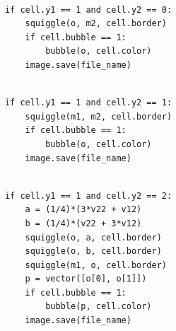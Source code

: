\documentclass{book}
\newcounter{pcounter}
\begin{document}
\begin{center}
\begin{tcolorbox}[width=5in,colback={white},title={\begin{center}\texttt{Python \thepcounter} \addtocounter{pcounter}{1}  \end{center}},colbacktitle=Red,coltitle=black]
\begin{verbatim}

            if cell.y1 == 1 and cell.y2 == 0:
                squiggle(o, m2, cell.border)
                if cell.bubble == 1:
                    bubble(o, cell.color)
                image.save(file_name)

\end{verbatim}%
\end{tcolorbox}
\end{center}

\begin{center}
\begin{tcolorbox}[width=5in,colback={white},title={\begin{center}\texttt{Python \thepcounter} \addtocounter{pcounter}{1}  \end{center}},colbacktitle=Red,coltitle=black]
\begin{verbatim}

            if cell.y1 == 1 and cell.y2 == 1:
                squiggle(m1, m2, cell.border)
                if cell.bubble == 1:
                    bubble(o, cell.color)
                image.save(file_name)

\end{verbatim}%
\end{tcolorbox}
\end{center}

\begin{center}
\begin{tcolorbox}[width=5in,colback={white},title={\begin{center}\texttt{Python \thepcounter} \addtocounter{pcounter}{1}  \end{center}},colbacktitle=Red,coltitle=black]
\begin{verbatim}

            if cell.y1 == 1 and cell.y2 == 2:
                a = (1/4)*(3*v22 + v12)
                b = (1/4)*(v22 + 3*v12)
                squiggle(o, a, cell.border)
                squiggle(o, b, cell.border)
                squiggle(m1, o, cell.border)
                p = vector([o[0], o[1]])
                if cell.bubble == 1:
                    bubble(p, cell.color)
                image.save(file_name)

\end{verbatim}%
\end{tcolorbox}
\end{center}
\end{document}
